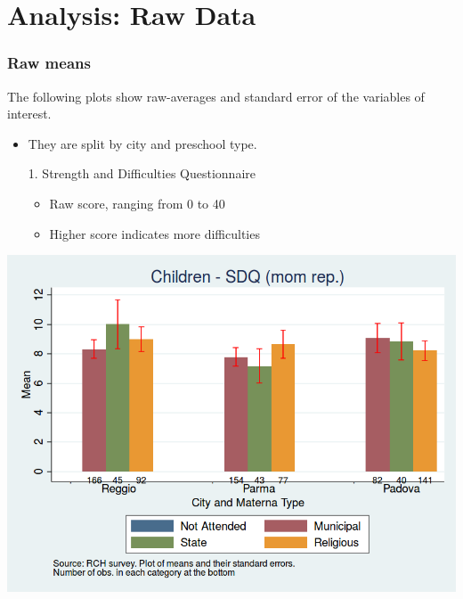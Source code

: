 \documentclass{beamer}
\begin{document}

\section{Analysis: Raw Data}
\begin{frame}\frametitle{Raw means}
The following plots show raw-averages and standard error of the variables of interest.
\begin{itemize}
	\item They are split by city and preschool type.
	\vspace{2ex}
\end{itemize}
\end{frame}

\begin{frame}
\begin{itemize}
	\centering
	\item[1.] Strength and Difficulties Questionnaire
	\begin{itemize}
		\centering
		\item Raw score, ranging from 0 to 40
		\item Higher score indicates more difficulties
	\end{itemize}
\end{itemize}
\end{frame}

\begin{frame}
\center
\includegraphics[scale=0.40]{../Output/childSDQ_score_Child.png}
\end{frame}
\end{document}
